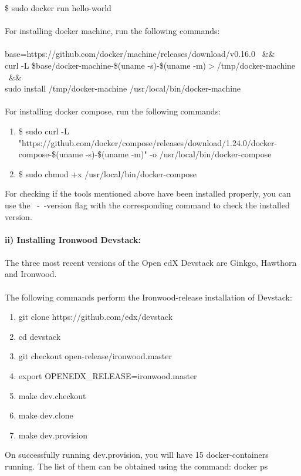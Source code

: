 \documentclass[12pt]{report}
\begin{document}
\$ sudo docker run hello-world\\\\
For installing docker machine, run the following commands:\\ \\
base=https://github.com/docker/machine/releases/download/v0.16.0 \ \&\& \\
curl -L \$base/docker-machine-\$(uname -s)-\$(uname -m)$>$/tmp/docker-machine \ \&\& \\
sudo install /tmp/docker-machine /usr/local/bin/docker-machine\\ \\
For installing docker compose, run the following commands:
\begin{enumerate}
	\item \$ sudo curl -L "https://github.com/docker/compose/releases/download/1.24.0/docker-compose-\$(uname -s)-\$(uname -m)" -o /usr/local/bin/docker-compose
	\item \$ sudo chmod +x /usr/local/bin/docker-compose
\end{enumerate}
For checking if the tools mentioned above have been installed properly, you can use the \ -\ -version flag with the corresponding command to check the installed version.\\\\
\textbf{ii) Installing Ironwood Devstack:} \\ \\
The three most recent versions of the Open edX Devstack are Ginkgo, Hawthorn and Ironwood. \\\\
The following commands perform the Ironwood-release installation of Devstack:
\begin{enumerate}
	\item git clone https://github.com/edx/devstack
	\item cd devstack
	\item git checkout open-release/ironwood.master
	\item export OPENEDX\_RELEASE=ironwood.master
	\item make dev.checkout
	\item make dev.clone
	\item make dev.provision
\end{enumerate}
On successfully running dev.provision, you will have 15 docker-containers running. The list of them can be obtained using the command:  docker ps
\\\\
\end{document}

